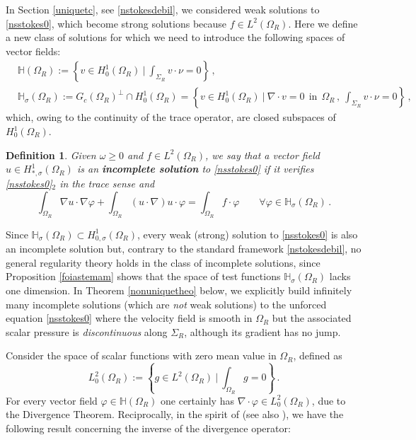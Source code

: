 \documentclass[a4paper,11pt]{article}
\newtheorem{definition}[theorem]{Definition}
\numberwithin{equation}{section}
\numberwithin{figure}{section}
\begin{document}
In Section \ref{uniquetc}, see \eqref{nstokesdebil}, we considered weak solutions to \eqref{nsstokes0}, which become strong solutions because
$f\in L^2(\Omega_R)$. Here we define a new class of solutions for which we need to introduce the following spaces of vector fields:
$$
\begin{aligned}
& \mathbb{H}(\Omega_{R}) := \left\{ v \in H^{1}_{0}(\Omega_{R}) \ \bigg| \ \int_{\Sigma_{R}} v \cdot \nu = 0 \right\} \, , \\[6pt]
& \mathbb{H}_{\sigma}(\Omega_{R}) := G_{c}(\Omega_R)^{\perp} \cap H^{1}_{0}(\Omega_{R}) = \left\{ v \in H^{1}_{0}(\Omega_{R}) \ \bigg|
\ \nabla \cdot v = 0 \ \ \text{in} \ \ \Omega_{R} \, , \ \int_{\Sigma_{R}} v \cdot \nu = 0 \right\} \, ,
\end{aligned}
$$
which, owing to the continuity of the trace operator, are closed subspaces of $H^{1}_{0}(\Omega_{R})$.

\begin{definition} \label{incompletedef}
Given $\omega\ge0$ and $f \in L^2(\Omega_R)$, we say that a vector field $u \in H^{1}_{*,\sigma}(\Omega_{R})$ is an
\textbf{incomplete solution} to \eqref{nsstokes0} if it verifies \eqref{nsstokes0}$_2$ in the trace sense and
\begin{equation} \label{nstokesdebilstar}
\int_{\Omega_{R}} \nabla u \cdot \nabla \varphi + \int_{\Omega_{R}} (u \cdot \nabla) u \cdot \varphi  = \int_{\Omega_{R}} f \cdot \varphi \qquad
\forall \varphi \in \mathbb{H}_{\sigma}(\Omega_{R})\, .
\end{equation}
\end{definition}
Since $\mathbb{H}_{\sigma}(\Omega_{R})\subset H^{1}_{0,\sigma}(\Omega_{R})$, every weak (strong) solution to \eqref{nsstokes0}
is also an incomplete
solution but, contrary to the standard framework \eqref{nstokesdebil}, no general regularity theory holds in the class of incomplete solutions, since Proposition \ref{foiastemam} shows that the space of test functions $\mathbb{H}_{\sigma}(\Omega_{R})$ lacks one dimension. In Theorem \ref{nonuniquetheo} below, we explicitly build infinitely many incomplete solutions (which are \textit{not} weak solutions) to the
unforced equation \eqref{nsstokes0} where the velocity field is smooth in $\Omega_{R}$ but the associated scalar pressure is {\it discontinuous}
along $\Sigma_{R}$, although its gradient has no jump.\par

Consider the space of scalar functions with zero mean value in $\Omega_{R}$, defined as
\begin{equation} \label{l02}
	L^2_0(\Omega_{R}) := \left\{ g\in L^2(\Omega_{R}) \ \Big | \ \int_{\Omega_{R}} g = 0 \right\} \, .
\end{equation}
For every vector field $\varphi \in \mathbb{H}(\Omega_{R})$ one certainly has $\nabla \cdot \varphi \in L^2_0(\Omega_{R})$, due to the Divergence Theorem. Reciprocally, in the spirit of \cite[Lemma 1]{pileckas1983spaces} (see also \cite[Lemma 1.8.13]{korobkov2024steady}), we have the following result concerning the inverse of the divergence operator:
\end{document}
